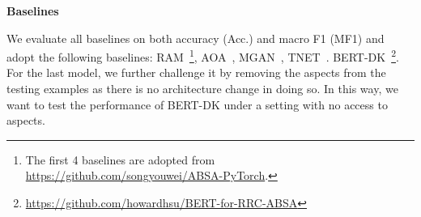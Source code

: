 \textbf{Baselines}\\
\label{chap6:sec:baselines}

We evaluate all baselines on both accuracy (Acc.) and macro F1 (MF1) and adopt the following baselines:
RAM~\cite{chen2017recurrent}\footnote{The first 4 baselines are adopted from \url{https://github.com/songyouwei/ABSA-PyTorch}.},
AOA~\cite{huang2018aspect},
MGAN~\cite{li2018exploiting},
TNET~\cite{li2018transformation}. 
BERT-DK~\cite{xu_bert2019}\footnote{\url{https://github.com/howardhsu/BERT-for-RRC-ABSA}}. 
For the last model, we further challenge it by removing the aspects from the testing examples as there is no architecture change in doing so. 
In this way, we want to test the performance of BERT-DK under a setting with no access to aspects. 

